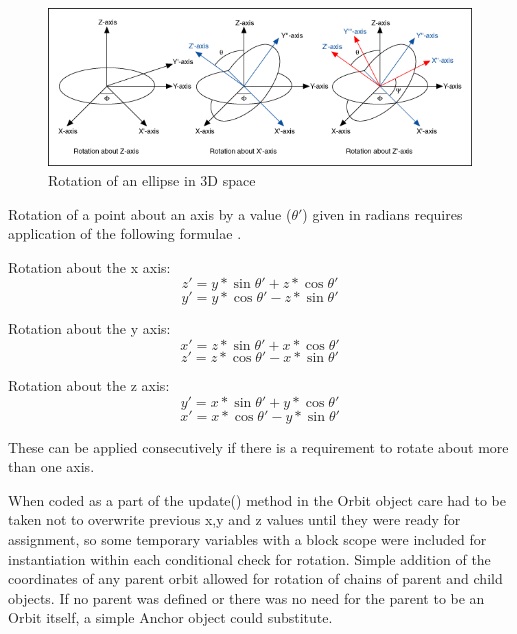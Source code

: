 \documentclass[twoside]{bhamthesis}
\begin{document}
\begin{figure}[h!]
  \includegraphics[width=\linewidth]{images/3dcartrot.png}
  \caption{Rotation of an ellipse in 3D space {\cite{_3d_2011}}}
  \label{fig:cartrot}
\end{figure}

Rotation of a point about an axis by a value ($\theta'$) given in radians requires application of the following formulae \cite{acm_siggraph_education_committee_3d_2005}. 

Rotation about the x axis:
\[z' = y*\sin\theta' + z*\cos\theta'\]
\[y' = y*\cos\theta' - z*\sin\theta'\]

Rotation about the y axis:
\[x' = z*\sin\theta' + x*\cos\theta'\]
\[z' = z*\cos\theta' - x*\sin\theta'\]

Rotation about the z axis:
\[y' = x*\sin\theta' + y*\cos\theta'\]
\[x' = x*\cos\theta' - y*\sin\theta'\]

These can be applied consecutively if there is a requirement to rotate about more than one axis.

\bigskip
When coded as a part of the update() method in the Orbit object care had to be taken not to overwrite previous x,y and z values until they were ready for assignment, so some temporary variables with a block scope were included for instantiation within each conditional check for rotation. Simple addition of the coordinates of any parent orbit allowed for rotation of chains of parent and child objects. If no parent was defined or there was no need for the parent to be an Orbit itself, a simple Anchor object could substitute.

\newpage
\end{document}
